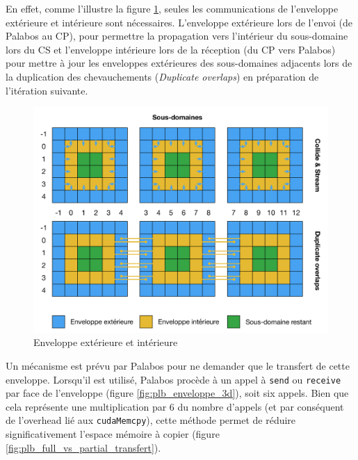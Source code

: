 En effet, comme l'illustre la figure \ref{fig:plb_enveloppes}, seules les communications de l'enveloppe extérieure et intérieure sont nécessaires.
L'enveloppe extérieure lors de l'envoi (de Palabos au \ac{CP}), pour permettre la propagation vers l'intérieur du sous-domaine lors du \ac{CS} et l'enveloppe intérieure lors de la réception (du \ac{CP} vers Palabos) pour mettre à jour les enveloppes extérieures des sous-domaines adjacents lors de la duplication des chevauchements (\textit{Duplicate overlaps}) en préparation de l'itération suivante. 

\begin{figure}[h]
	\centering
	\includegraphics[scale=0.62, fbox]{images/enveloppes_interrieures_exeterrieures.pdf}
	\caption{Enveloppe extérieure et intérieure}
	\label{fig:plb_enveloppes}
\end{figure}

Un mécanisme est prévu par Palabos pour ne demander que le transfert de cette enveloppe. Lorsqu'il est utilisé, Palabos procède à un appel à \texttt{send} ou \texttt{receive} par face de l'enveloppe (figure \ref{fig:plb_enveloppe_3d}), soit six appels. Bien que cela représente une multiplication par 6 du nombre d'appels (et par conséquent de l'overhead lié aux \texttt{cudaMemcpy}), cette méthode permet de réduire significativement l'espace mémoire à copier (figure \ref{fig:plb_full_vs_partial_transfert}).

